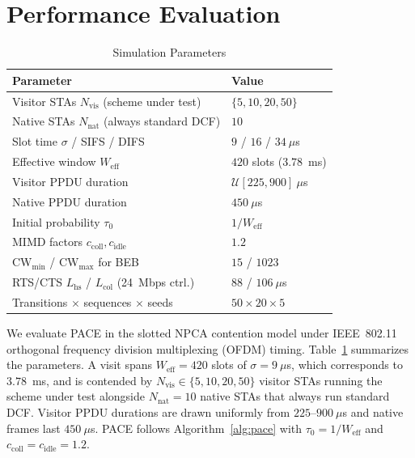 \documentclass[conference]{IEEEtran}
\newcommand{\Nvis}{N_\mathrm{vis}}
\newcommand{\Nnat}{N_\mathrm{nat}}
\begin{document}
\section{Performance Evaluation}
\label{sec:performance_evaluation}

\begin{table}[t]
\centering
\caption{Simulation Parameters}
\label{tab:sim_params}
\begin{tabular}{ll}
\hline
\textbf{Parameter} & \textbf{Value} \\
\hline
Visitor STAs $\Nvis$ (scheme under test) & $\{5, 10, 20, 50\}$ \\
Native STAs $\Nnat$ (always standard DCF) & $10$ \\
Slot time $\sigma$ / SIFS / DIFS  & $9$ / $16$ / $34~\mu$s \\
Effective window $W_\mathrm{eff}$ & $420$ slots ($3.78$~ms) \\
Visitor PPDU duration            & $\mathcal{U}[225, 900]~\mu$s \\
Native PPDU duration             & $450~\mu$s \\
Initial probability $\tau_0$     & $1/W_\mathrm{eff}$ \\
MIMD factors $c_\mathrm{coll},c_\mathrm{idle}$ & $1.2$ \\
$\mathrm{CW}_{\min}$ / $\mathrm{CW}_{\max}$ for BEB & $15$ / $1023$ \\
RTS/CTS $L_\mathrm{hs}$ / $L_\mathrm{col}$ (24~Mbps ctrl.) & $88$ / $106~\mu$s \\
Transitions $\times$ sequences $\times$ seeds & $50 \times 20 \times 5$ \\
\hline
\end{tabular}
\end{table}

We evaluate PACE in the slotted NPCA contention model under IEEE~802.11 orthogonal frequency division multiplexing (OFDM) timing. Table~\ref{tab:sim_params} summarizes the parameters. A visit spans $W_\mathrm{eff}=420$ slots of $\sigma=9~\mu$s, which corresponds to $3.78$~ms, and is contended by $\Nvis\in\{5,10,20,50\}$ visitor STAs running the scheme under test alongside $\Nnat=10$ native STAs that always run standard DCF. Visitor PPDU durations are drawn uniformly from $225$--$900~\mu$s and native frames last $450~\mu$s. PACE follows Algorithm~\ref{alg:pace} with $\tau_0=1/W_\mathrm{eff}$ and $c_\mathrm{coll}=c_\mathrm{idle}=1.2$. 
\end{document}
